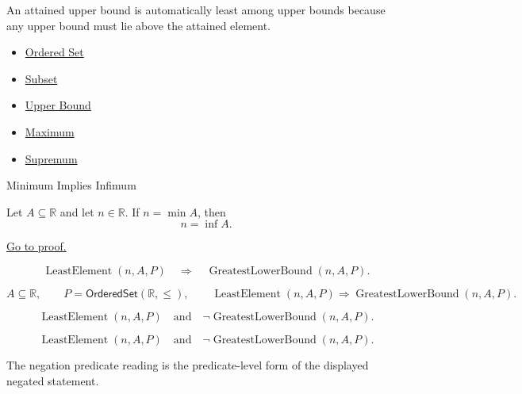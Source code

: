 \begin{remark*}[Interpretation]
An attained upper bound is automatically least among upper bounds because
any upper bound must lie above the attained element.
\end{remark*}

\begin{dependencies}
\begin{itemize}
  \item \hyperref[def:ordered-set]{Ordered Set}
  \item \hyperref[def:subset]{Subset}
  \item \hyperref[def:real-upper-bound]{Upper Bound}
  \item \hyperref[def:maximum]{Maximum}
  \item \hyperref[def:supremum]{Supremum}
\end{itemize}
\end{dependencies}

\begin{propositionbox}{Minimum Implies Infimum}
\begin{proposition}
\label{prop:minimum-implies-infimum}
Let $A\subseteq\mathbb{R}$ and let $n\in\mathbb{R}$. If $n=\min A$, then
\[
  n=\inf A.
\]

\hyperref[prf:minimum-implies-infimum]{Go to proof.}
\end{proposition}
\end{propositionbox}

\begin{remark*}
\[
  \operatorname{LeastElement}(n,A,P)
  \quad\Longrightarrow\quad
  \operatorname{GreatestLowerBound}(n,A,P).
\]
\end{remark*}

\begin{remark*}
\[
  A\subseteq\mathbb{R},\qquad P=\mathsf{OrderedSet}(\mathbb{R},\leq),\qquad
  \operatorname{LeastElement}(n,A,P)\Longrightarrow
  \operatorname{GreatestLowerBound}(n,A,P).
\]
\end{remark*}

\begin{remark*}
\[
  \operatorname{LeastElement}(n,A,P)
  \quad\text{and}\quad
  \neg\operatorname{GreatestLowerBound}(n,A,P).
\]
\end{remark*}

\begin{remark*}
\[
  \operatorname{LeastElement}(n,A,P)
  \quad\text{and}\quad
  \neg\operatorname{GreatestLowerBound}(n,A,P).
\]

The negation predicate reading is the predicate-level form of the displayed negated statement.
\end{remark*}

